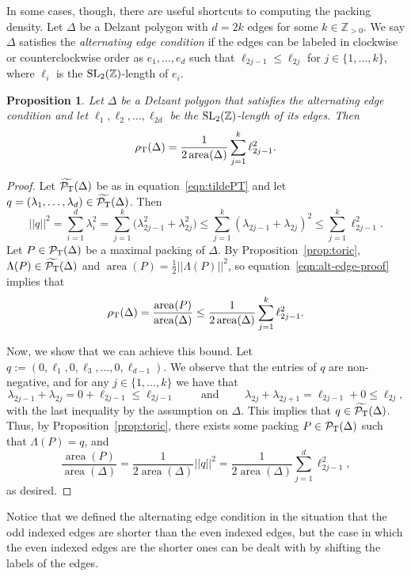 \documentclass[10pt,a4paper]{amsart}
\numberwithin{equation}{section}
\newtheorem{Proposition}[Theorem]{Proposition}
\def\Z{{\mathbb Z}}
\newcommand{\De}{\Delta}
\newcommand{\area}{\operatorname{area}}
\newcommand{\PT}{\mathcal{P}_{\rm T}}
\newcommand{\PTtilde}{\widetilde{\PT}}
\newcommand{\SL}{{\rm SL}_2(\Z)}
\theoremstyle{definition}
\theoremstyle{plain}
\theoremstyle{plain}
\begin{document}
In some cases, though, there are useful shortcuts to computing the packing density. Let $\De$ be a Delzant polygon with $d=2k$ edges for some $k\in\Z_{>0}$. We say $\De$ satisfies the \emph{alternating edge condition} if the edges can be labeled in clockwise or counterclockwise order as $e_1,\ldots,e_d$ such that $\ell_{2j-1} \leq \ell_{2j}$ for $j\in\{1,\ldots,k\}$, where $\ell_i$ is the $\SL$-length of $e_i$.

 \begin{Proposition}\label{prop:alt}
 Let $\De$ be a Delzant polygon that satisfies the alternating edge condition and let $\ell_1, \ell_2,\dots,\ell_{2d}$ be the $\SL$-length of its edges. Then
 \[\rho_{{\rm T}}(\De) = \frac{1}{2\area(\De)}\sum_{j=1}^k \ell_{2j-1}^2.\]
 \end{Proposition}

\begin{proof}
Let $\PTtilde(\De)$ be as in equation~\eqref{eqn:tildePT} and let $q=(\lambda_1,\ldots,\lambda_d)\in\PTtilde(\De)$.
Then
\begin{equation}\label{eqn:alt-edge-proof}
 ||q||^2
 = \sum_{i=1}^d \lambda_i^2
 = \sum_{j=1}^k \big(\lambda_{2j-1}^2 + \lambda_{2j}^2\big)
 \leq \sum_{j=1}^k (\lambda_{2j-1} + \lambda_{2j})^2
 \leq \sum_{j=1}^k \ell_{2j-1}^2.
\end{equation}
Let $P\in\PT(\De)$ be a maximal packing of $\De$. By Proposition~\ref{prop:toric}, $\Lambda(P)\in\PTtilde(\De)$ and $\area(P) = \frac{1}{2}||\Lambda(P)||^2$, so equation~\eqref{eqn:alt-edge-proof} implies that
 \[\rho_{{\rm T}}(\De) = \frac{\area(P)}{\area(\De)} \leq \frac{1}{2\area(\De)} \sum_{j=1}^k \ell_{2j-1}^2.\]

Now, we show that we can achieve this bound. Let $q := (0,\ell_1,0,\ell_3,\dots,0,\ell_{d-1})$. We observe that the entries of $q$ are non-negative, and for any $j\in\{1,\ldots,k\}$ we have that \[\lambda_{2j-1} + \lambda_{2j} = 0 + \ell_{2j-1} \leq \ell_{2j-1}\qquad\textrm{ and }\qquad \lambda_{2j} + \lambda_{2j+1} = \ell_{2j-1} + 0 \leq \ell_{2j},\] with the last inequality by the assumption on $\De$. This implies that $q \in \PTtilde(\De)$.
Thus, by Proposition~\ref{prop:toric}, there exists some packing $P\in\PT(\De)$ such that $\Lambda(P) = q$,
and
\[
 \frac{\area(P)}{\area(\De)} = \frac{1}{2\area(\De)}||q||^2 = \frac{1}{2\area(\De)}\sum_{j=1}^d \ell_{2j-1}^2,
\]
as desired.
\end{proof}

Notice that we defined the alternating edge condition in the situation that the odd indexed edges are shorter than the even indexed edges, but the case in which the even indexed edges are the shorter ones can be dealt with by shifting the labels of the edges.
\end{document}
